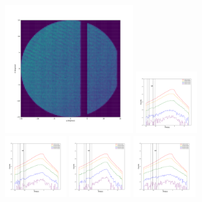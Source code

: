 \documentclass[12pt,prd]{article}
\begin{document}
\begin{figure}[h!]
\centering
\includegraphics[width=0.5\textwidth]{../figures/histogram2dgaiascan_l337_5_b74_4_ra201_9_dec14_0_npy.pdf}
\includegraphics[width=0.24\textwidth]{../figures/scanning_plotsgaiascan_l337_5_b74_4_ra201_9_dec14_0_npy_0.pdf}
\includegraphics[width=0.24\textwidth]{../figures/scanning_plotsgaiascan_l337_5_b74_4_ra201_9_dec14_0_npy_1.pdf}
\includegraphics[width=0.24\textwidth]{../figures/scanning_plotsgaiascan_l337_5_b74_4_ra201_9_dec14_0_npy_2.pdf}
\includegraphics[width=0.24\textwidth]{../figures/scanning_plotsgaiascan_l337_5_b74_4_ra201_9_dec14_0_npy_3.pdf}

\end{figure}
\end{document}
